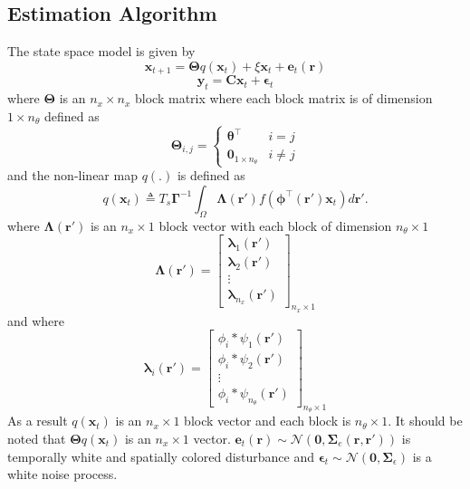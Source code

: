 \documentclass[]{article}
\begin{document}
\subsection{Estimation Algorithm}
The state space model is given by
\begin{equation}
 \mathbf x_{t+1}=\boldsymbol\Theta q(\mathbf x_t)+\xi \mathbf x_t+\boldsymbol e_t(\mathbf r)
\end{equation}
\begin{equation}
 \mathbf y_t=\mathbf C \mathbf x_t+\boldsymbol \epsilon_t
\end{equation}
where $\boldsymbol\Theta$ is an $n_x \times n_x$ block matrix where each block matrix is of dimension $ 1\times n_{\theta}$ defined as
\begin{equation}
\boldsymbol \Theta_{i,j}=\left\lbrace  \begin{array}{cc}
\boldsymbol \theta^\top &i=j \\
\mathbf 0_{1 \times n_{\theta}}& i\neq j  
 \end{array}\right. 
\end{equation}
and the non-linear map $q(.)$ is defined as
\begin{equation}\label{eq:QmatrixForSigmapoints}
	q(\mathbf{x}_t) \triangleq T_s\boldsymbol{\Gamma}^{-1} \int_\Omega \boldsymbol{\Lambda}(\mathbf{r}') f(\boldsymbol{\phi}^{\top}(\mathbf{r}')\mathbf{x}_t) d\mathbf{r}'.
\end{equation}
where $\boldsymbol{\Lambda}(\mathbf{r}')  $ is an $n_x \times 1$ block vector with each block of dimension $n_{\theta} \times 1 $
\begin{equation}\label{eq:DefPsi}
\boldsymbol{\Lambda}(\mathbf{r}')=\begin{bmatrix}\boldsymbol \lambda_1(\mathbf r')\\\boldsymbol \lambda_2(\mathbf r')\\ \vdots \\ \boldsymbol \lambda_{n_{x}}(\mathbf r') \end{bmatrix}_{n_x \times 1}
\end{equation}
and where
\begin{equation}
\boldsymbol \lambda_i(\mathbf r') =\begin{bmatrix} \phi_i\ast \psi_1(\mathbf r') \\ \phi_i\ast \psi_2 (\mathbf r') \\ \vdots \\ \phi_i\ast \psi_{n_{\theta}}(\mathbf r') \end{bmatrix}_{n_{\theta} \times 1}
\end{equation}
As a result $q(\mathbf x_t)$ is an $n_x \times 1$ block vector and each block is $n_{\theta} \times 1$. It should be noted that $\boldsymbol\Theta q(\mathbf x_t)$ is an $n_x \times 1$ vector.
$ \boldsymbol e_t(\mathbf r)\sim \mathcal N(\mathbf 0,\boldsymbol\Sigma_e(\mathbf r,\mathbf r'))$ is temporally white and spatially colored disturbance and  $\boldsymbol\epsilon_t\sim \mathcal N(\mathbf 0,\boldsymbol\Sigma_{\epsilon})$ is a white noise process.
\end{document}
